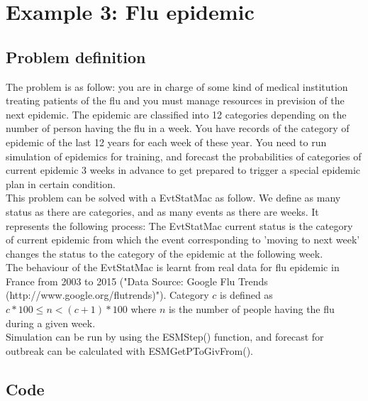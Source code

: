 \documentclass[12pt, a4paper]{article}
\begin{document}
\section{Example 3: Flu epidemic}

\subsection{Problem definition}

The problem is as follow: you are in charge of some kind of medical institution treating patients of the flu and you must manage resources in prevision of the next epidemic. The epidemic are classified into 12 categories depending on the number of person having the flu in a week. You have records of the category of epidemic of the last 12 years for each week of these year. You need to run simulation of epidemics for training, and forecast the probabilities of categories of current epidemic 3 weeks in advance to get prepared to trigger a special epidemic plan in certain condition.\\

This problem can be solved with a EvtStatMac as follow. We define as many status as there are categories, and as many events as there are weeks. It represents the following process: The EvtStatMac current status is the category of current epidemic from which the event corresponding to 'moving to next week' changes the status to the category of the epidemic at the following week.\\

The behaviour of the EvtStatMac is learnt from real data for flu epidemic in France from 2003 to 2015 ("Data Source: Google Flu Trends (http://www.google.org/flutrends)"). Category $c$ is defined as $c*100\le n<(c+1)*100$ where $n$ is the number of people having the flu during a given week.\\

Simulation can be run by using the {\ttfamily ESMStep()} function, and forecast for outbreak can be calculated with {\ttfamily ESMGetPToGivFrom()}.\\

\subsection{Code}
\end{document}
